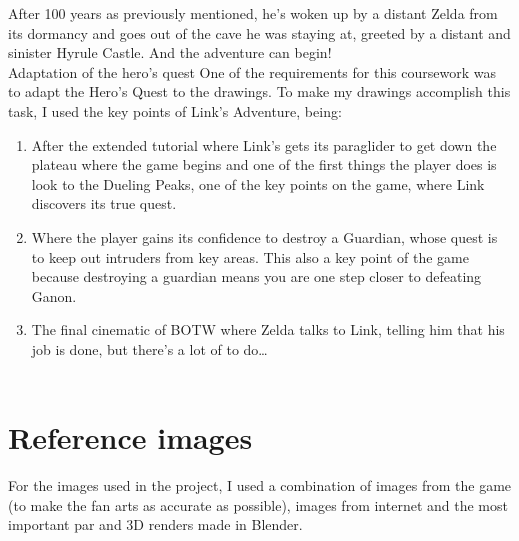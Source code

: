 \documentclass{cup-pan}
\begin{document}
    After 100 years as previously mentioned, he's woken up by a distant Zelda from its dormancy and goes out of the cave he was staying at, greeted by a distant and sinister Hyrule Castle. And the adventure can begin!\\
    
    \textcolor{PANDarkBlue}{\large Adaptation of the hero's quest}
    One of the requirements for this coursework was to adapt the Hero's Quest to the drawings.
    To make my drawings accomplish this task, I used the key points of Link's Adventure, being:\\
        \begin{enumerate}
            \item After the extended tutorial where Link's gets its paraglider to get down the plateau where the game begins and one of the first things the player does is look to the Dueling Peaks, one of the key points on the game, where Link discovers its true quest.\\
            \item Where the player gains its confidence to destroy a Guardian, whose quest is to keep out intruders from key areas. This also a key point of the game because destroying a guardian means you are one step closer to defeating Ganon. \\
            \item The final cinematic of BOTW where Zelda talks to Link, telling him that his job is done, but there's a lot of to do\dots\\  \\
        \end{enumerate}

\newpage
\section{Reference images}

    For the images used in the project, I used a combination of images from the game (to make the fan arts as accurate as possible), images from internet and the most important par and 3D renders made in Blender.\\
\end{document}
